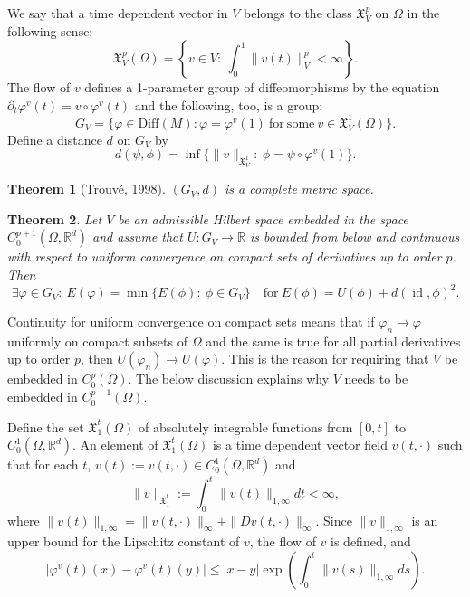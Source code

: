 \documentclass[a5paper,11pt,twoside]{article}
\theoremstyle{plain}
\newtheorem{teo}{Theorem}[section]
\newcommand{\R}{\ensuremath{\mathbb{R}}}
\newcommand{\X}{\ensuremath{\mathfrak{X}}}
\newcommand{\Diff}{\ensuremath{\mathrm{Diff}}}
\newcommand{\id}{\operatorname{id}}
\theoremstyle{definition}
\begin{document}
We say that a time dependent vector in $V$ belongs to the class $\X_V^p$ on $\Omega$ in the following sense:
\[
\X_V^p(\Omega)=\left\{v\in V:\ \int_0^1\|v(t)\|_V^p<\infty\right\}.
\]
The flow of $v$ defines a 1-parameter group of diffeomorphisms by the equation $\partial_t\varphi^v(t)=v\circ\varphi^v(t)$ and the following, too, is a group:
\[
G_V=\{\varphi\in \Diff(M): \varphi=\varphi^v(1)\ \mathrm{for\ some\ } v\in\X_V^1(\Omega)\}.
\]
Define a distance $d$ on $G_V$ by
\[
d(\psi,\phi)=\inf\{\|v\|_{\X_V^1}:\ \phi=\psi\circ\varphi^v(1)\}.
\]

\begin{teo}[Trouvé, 1998]
$(G_V,d)$ is a complete metric space.
\end{teo}



\begin{teo}
Let $V$ be an admissible Hilbert space embedded in the space $C_0^{p+1}(\Omega,\R^d)$ and assume that $U:G_V\to\R$ is bounded from below and continuous with respect to uniform convergence on compact sets of derivatives up to order $p$. Then
\[
\exists \varphi\in G_V:\ E(\varphi)=\min\{E(\phi):\ \phi\in G_V\}\quad \mathrm{for\ } E(\phi)=U(\phi)+d(\id,\phi)^2.
\]
\end{teo}

Continuity for uniform convergence on compact sets means that if $\varphi_n\to\varphi$ uniformly on compact subsets of $\Omega$ and the same is true for all partial derivatives up to order $p$, then $U(\varphi_n)\to U(\varphi)$. This is the reason for requiring that $V$ be embedded in $C_0^p(\Omega)$. 
The below discussion explains why $V$ needs to be embedded in $C^{p+1}_0(\Omega)$.


Define the set $\X_1^t(\Omega)$ of absolutely integrable functions from $[0,t]$ to $C_0^1(\Omega,\R^d)$. An element of $\X_1^t(\Omega)$ is a time dependent vector field $v(t,\cdot)$ such that for each $t$, $v(t):=v(t,\cdot)\in C_0^1(\Omega,\R^d)$ and
\[
\|v\|_{\X_1^t}:=\int_0^t\|v(t)\|_{1,\infty}dt<\infty,
\]
where $\|v(t)\|_{1,\infty}=\|v(t,\cdot)\|_\infty+\|Dv(t,\cdot)\|_\infty$. Since $\|v\|_{1,\infty}$ is an upper bound for the Lipschitz constant of $v$, the flow of $v$ is defined, and
%
\begin{equation}
|\varphi^v(t)(x)-\varphi^v(t)(y)|\leq |x-y|\exp\left(\int_0^t\|v(s)\|_{1,\infty}ds\right).
\end{equation}
\end{document}
